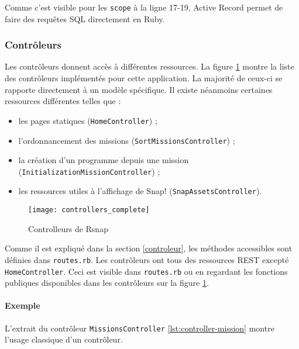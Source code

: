 Comme c'est visible pour les \lstinline[language=Rails]{scope} à la ligne 17-19, Active Record permet de faire des requêtes SQL directement en Ruby.
\begin{figure}

\end{figure}

\subsubsection{Contrôleurs}
Les contrôleurs donnent accès à différentes ressources. La figure \ref{fig:controllers} montre la liste des contrôleurs implémentés pour cette application. La majorité de ceux-ci se rapporte directement à un modèle spécifique. Il existe néanmoins certaines ressources différentes telles que :
\begin{itemize}
  \item les pages statiques (\texttt{HomeController}) ;
  \item l'ordonnancement des missions (\texttt{SortMissionsController}) ;
  \item la création d'un programme depuis une mission (\texttt{InitializationMissionController}) ;
  \item les ressources utiles à l'affichage de Snap! (\texttt{SnapAssetsController}).
\end{itemize}

\begin{figure}
 \begin{center}
   \texttt{[image: controllers\_complete]}
   \caption{Controlleurs de Rsnap}
   \label{fig:controllers}
 \end{center}
\end{figure}

Comme il est expliqué dans la section \ref{controleur}, les méthodes accessibles sont définies dans \texttt{routes.rb}. Les contrôleurs ont tous des ressources REST excepté \texttt{HomeController}. Ceci est visible dans \texttt{routes.rb} ou en regardant les fonctions publiques disponibles dans les contrôleurs sur la figure \ref{fig:controllers}.

\paragraph{Exemple}
L'extrait du contrôleur \texttt{MissionsController} \ref{lst:controller-mission} montre l'usage classique d'un contrôleur.

